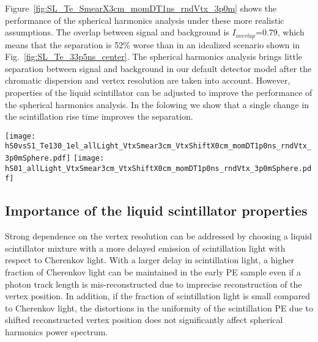 Figure~\ref{fig:SL_Te_SmearX3cm_momDT1ns_rndVtx_3p0m} shows the performance of the spherical harmonics analysis under these more realistic 
assumptions. The overlap between signal and background is $I_{overlap}$=0.79, which means that the separation is 52\% worse than in 
an idealized scenario shown in Fig.~\ref{fig:SL_Te_33p5ns_center}.
The spherical harmonics analysis brings little
separation between signal and background in our default detector model after the chromatic dispersion and
vertex resolution are taken into account. However, properties of the liquid scintillator can be adjusted to improve 
the performance of the spherical harmonics analysis. In the folowing we show that a single change in the scintillation rise time
improves the separation.



\begin{figure*}[h]
  \centering
  \texttt{[image: hS0vsS1\_Te130\_1el\_allLight\_VtxSmear3cm\_VtxShiftX0cm\_momDT1p0ns\_rndVtx\_3p0mSphere.pdf]}
  \texttt{[image: hS01\_allLight\_VtxSmear3cm\_VtxShiftX0cm\_momDT1p0ns\_rndVtx\_3p0mSphere.pdf]}
  \caption{\emph{Left:} Scatter plot of $S_0$ versus $S_1$ for a simulation of 1000 signal (\emph{red crosses}) and background
    (\emph{blue triangles}) events. Event verticies are uniformly distributed within the fiducial volume, $R<3$~m.
    Vertex is smeared with 3~cm resolution. Differential cut of
    $\Delta t=t^{phot}_{measured} - t^{phot}_{predicted}<$1~ns is applied to select early PE sample.
    The default QE and 100\% photo-coverage is used in the simulation.
    Black dashed line corresponds to a linear fit to define 1-D variable $S_{01}$ (see text for details).
    \emph{Right:} Comparison of the $S_{01}$ distribution between signal (\emph{red solid line}) and background (\emph{blue dashed line}).
    $I_{overlap}$=0.79.}
\label{fig:SL_Te_SmearX3cm_momDT1ns_rndVtx_3p0m}
\end{figure*}



\subsection{Importance of the liquid scintillator properties}
Strong dependence on the vertex resolution can be addressed by choosing a liquid scintillator mixture with a more delayed emission 
of scintillation light with respect to Cherenkov light. With a larger delay in scintillation light, a higher fraction of Cherenkov light 
can be maintained in the early PE sample even if a photon track length is mis-reconstructed due to imprecise reconstruction of the vertex 
position. In addition, if the fraction of scintillation light is small compared to Cherenkov light, the distortions in the uniformity of 
the scintillation PE due to shifted reconstructed vertex position does not significantly affect spherical harmonics power spectrum.

